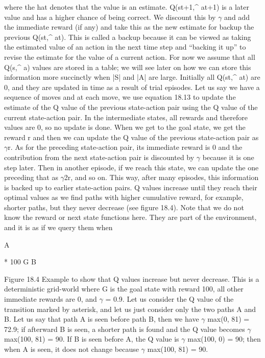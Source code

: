 where the hat denotes that the value is an estimate. Q(st+1,\textasciicircum{} at+1) is a later value and has a higher chance of being correct. We discount this by $\gamma$ and add the immediate reward (if any) and take this as the new estimate for backup the previous Q(st,\textasciicircum{} at). This is called a backup because it can be viewed as taking the estimated value of an action in the next time step and “backing it up” to revise the estimate for the value of a current action. For now we assume that all Q(s,\textasciicircum{} a) values are stored in a table; we will see later on how we can store this information more succinctly when |S| and |A| are large. Initially all Q(st,\textasciicircum{} at) are 0, and they are updated in time as a result of trial episodes. Let us say we have a sequence of moves and at each move, we use equation 18.13 to update the estimate of the Q value of the previous state-action pair using the Q value of the current state-action pair. In the intermediate states, all rewards and therefore values are 0, so no update is done. When we get to the goal state, we get the reward r and then we can update the Q value of the previous state-action pair as $\gamma$r. As for the preceding state-action pair, its immediate reward is 0 and the contribution from the next state-action pair is discounted by $\gamma$ because it is one step later. Then in another episode, if we reach this state, we can update the one preceding that as $\gamma$2r, and so on. This way, after many episodes, this information is backed up to earlier state-action pairs. Q values increase until they reach their optimal values as we find paths with higher cumulative reward, for example, shorter paths, but they never decrease (see figure 18.4). Note that we do not know the reward or next state functions here. They are part of the environment, and it is as if we query them when

A

* 100 G B

Figure 18.4 Example to show that Q values increase but never decrease. This is a deterministic grid-world where G is the goal state with reward 100, all other immediate rewards are 0, and $\gamma$ = 0.9. Let us consider the Q value of the transition marked by asterisk, and let us just consider only the two paths A and B. Let us say that path A is seen before path B, then we have $\gamma$ max(0, 81) = 72.9; if afterward B is seen, a shorter path is found and the Q value becomes $\gamma$ max(100, 81) = 90. If B is seen before A, the Q value is $\gamma$ max(100, 0) = 90; then when A is seen, it does not change because $\gamma$ max(100, 81) = 90.

